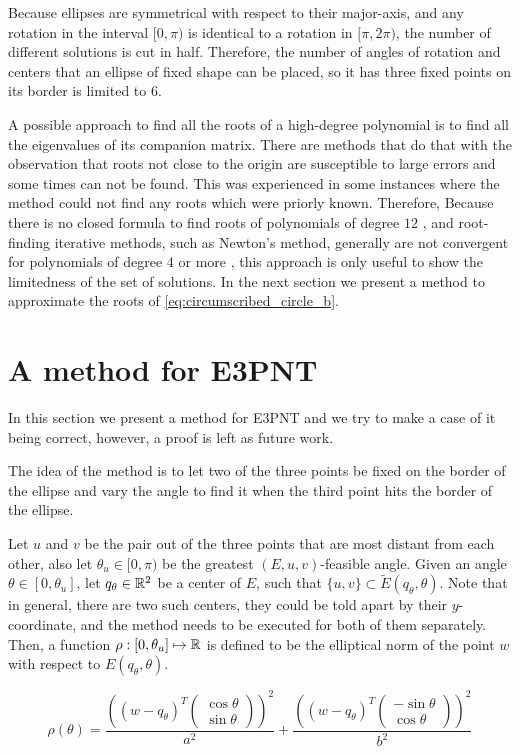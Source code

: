 Because ellipses are symmetrical with respect to their major-axis, and any rotation in the interval $[0, \pi)$ is identical to a rotation in $[\pi, 2\pi)$, the number of different solutions is cut in half.
Therefore, the number of angles of rotation and centers that an ellipse of fixed shape can be placed, so it has three fixed points on its border is limited to $6$.

A possible approach to find all the roots of a high-degree polynomial is to find all the eigenvalues of its companion matrix\cite{horn}. There are methods that do that with the observation that roots not close to the origin are susceptible to large errors and some times can not be found. This was experienced in some instances where the method could not find any roots which were priorly known.
Therefore, Because there is no closed formula to find roots of polynomials of degree $12$ \cite{skopenkov2015}, and root-finding iterative methods, such as Newton's method, generally are not convergent for polynomials of degree $4$ or more \cite{mc1}, this approach is only useful to show the limitedness of the set of solutions. In the next section we present a method to approximate the roots of \autoref{eq:circumscribed_circle_b}.

\section{A method for E3PNT}

In this section we present a method for E3PNT and we try to make a case of it being correct, however, a proof is left as future work.

The idea of the method is to let two of the three points be fixed on the border of the ellipse and vary the angle to find it when the third point hits the border of the ellipse.

Let $u$ and $v$ be the pair out of the three points that are most distant from each other, also let $\theta_u \in [0, \pi)$ be the greatest $(E, u, v)$-feasible angle. Given an angle $\theta \in [0, \theta_u]$, let $q_\theta\in\mathbb{R}^2$ be a center of $E$, such that $\{u, v\} \subset \tilde{E}(q_\theta, \theta)$. Note that in general, there are two such centers, they could be told apart by their $y$-coordinate, and the method needs to be executed for both of them separately.
Then, a function $\rho : [0, \theta_u] \mapsto \mathbb{R}$ is defined to be the elliptical norm of the point $w$ with respect to $E(q_\theta, \theta)$.

\begin{equation}\label{eq:rho}
\rho(\theta) = \dfrac{\left((w-q_\theta)^T\left(\begin{array}{c}
	\cos{\theta}\\
	\sin{\theta}
	\end{array}\right)\right)^2}{a^2}+
\dfrac{\left((w-q_\theta)^T\left(\begin{array}{c}
	-\sin{\theta}\\
	\cos{\theta}
	\end{array}\right)\right)^2}{b^2}
\end{equation}

